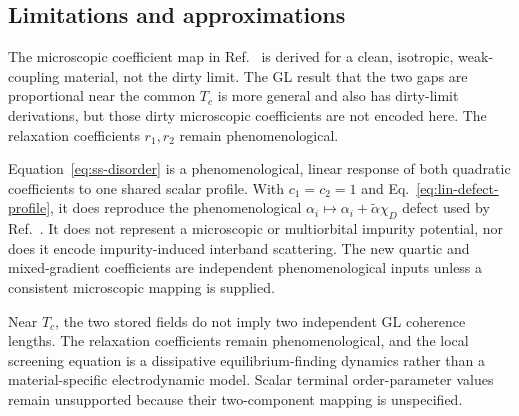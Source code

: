\documentclass[11pt]{article}
\begin{document}
\subsection{Limitations and approximations}

The microscopic coefficient map in Ref.~\cite{Kogan2011} is derived for a
clean, isotropic, weak-coupling material, not the dirty limit.  The GL result
that the two gaps are proportional near the common $T_c$ is more general and
also has dirty-limit derivations, but those dirty microscopic coefficients are
not encoded here.  The relaxation coefficients $r_1,r_2$ remain
phenomenological.

Equation~\eqref{eq:ss-disorder} is a phenomenological, linear response of both
quadratic coefficients to one shared scalar profile.  With $c_1=c_2=1$ and
Eq.~\eqref{eq:lin-defect-profile}, it does reproduce the phenomenological
$\alpha_i\mapsto\alpha_i+\widetilde\alpha\chi_D$ defect used by
Ref.~\cite{Lin2016}.  It does not represent a microscopic or multiorbital
impurity potential, nor does it encode impurity-induced interband scattering.
The new quartic and mixed-gradient coefficients are independent
phenomenological inputs unless a consistent microscopic mapping is supplied.

Near $T_c$, the two stored fields do not imply two independent GL coherence
lengths.  The relaxation coefficients remain phenomenological, and the local
screening equation is a dissipative equilibrium-finding dynamics rather than
a material-specific electrodynamic model.  Scalar terminal order-parameter
values remain unsupported because their two-component mapping is unspecified.
\end{document}
